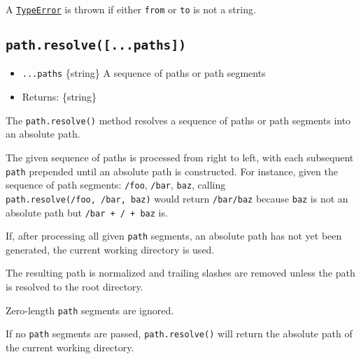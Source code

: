A \href{errors.md\#class-typeerror}{\texttt{TypeError}} is thrown if
either \texttt{from} or \texttt{to} is not a string.

\subsection{\texorpdfstring{\texttt{path.resolve({[}...paths{]})}}{path.resolve({[}...paths{]})}}\label{path.resolve...paths}

\begin{itemize}
\tightlist
\item
  \texttt{...paths} \{string\} A sequence of paths or path segments
\item
  Returns: \{string\}
\end{itemize}

The \texttt{path.resolve()} method resolves a sequence of paths or path
segments into an absolute path.

The given sequence of paths is processed from right to left, with each
subsequent \texttt{path} prepended until an absolute path is
constructed. For instance, given the sequence of path segments:
\texttt{/foo}, \texttt{/bar}, \texttt{baz}, calling
\texttt{path.resolve(\textquotesingle{}/foo\textquotesingle{},\ \textquotesingle{}/bar\textquotesingle{},\ \textquotesingle{}baz\textquotesingle{})}
would return \texttt{/bar/baz} because
\texttt{\textquotesingle{}baz\textquotesingle{}} is not an absolute path
but
\texttt{\textquotesingle{}/bar\textquotesingle{}\ +\ \textquotesingle{}/\textquotesingle{}\ +\ \textquotesingle{}baz\textquotesingle{}}
is.

If, after processing all given \texttt{path} segments, an absolute path
has not yet been generated, the current working directory is used.

The resulting path is normalized and trailing slashes are removed unless
the path is resolved to the root directory.

Zero-length \texttt{path} segments are ignored.

If no \texttt{path} segments are passed, \texttt{path.resolve()} will
return the absolute path of the current working directory.

